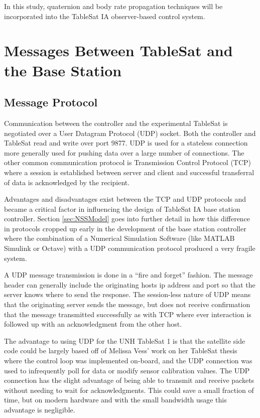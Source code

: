 In this study, quaternion and body rate propagation techniques will be incorporated into the TableSat IA observer-based control system.

\section{Messages Between TableSat and the Base Station}

\subsection{Message Protocol}
\label{subsec:UDPTCP}

Communication between the controller and the experimental TableSat is negotiated over a User Datagram Protocol (UDP) socket.  Both the controller and TableSat read and write over port 9877.  UDP is used for a stateless connection more generally used for pushing data over a large number of connections.  The other common communication protocol is Transmission Control Protocol (TCP) where a session is established between server and client and successful transferral of data is acknowledged by the recipient.

Advantages and disadvantages exist between the TCP and UDP protocols and became a critical factor in influencing the design of TableSat IA base station controller. Section \ref{sec:NSSModel} goes into further detail in how this difference in protocols cropped up early in the development of the base station controller where the combination of a Numerical Simulation Software (like MATLAB Simulink or Octave) with a UDP communication protocol produced a very fragile system.

A UDP message transmission is done in a ``fire and forget'' fashion.  The message header can generally include the originating hosts ip address and port so that the server knows where to send the response.  The session-less nature of UDP means that the originating server sends the message, but does not receive confirmation that the message transmitted successfully as with TCP where ever interaction is followed up with an acknowledgment from the other host.

The advantage to using UDP for the UNH TableSat 1 is that the satellite side code could be largely based off of Melissa Vess' work on her TableSat thesis where the control loop was implemented on-board, and the UDP connection was used to infrequently poll for data or modify sensor calibration values.  The UDP connection has the slight advantage of being able to transmit and receive packets without needing to wait for acknowledgments.  This could save a small fraction of time, but on modern hardware and with the small bandwidth usage this advantage is negligible.

